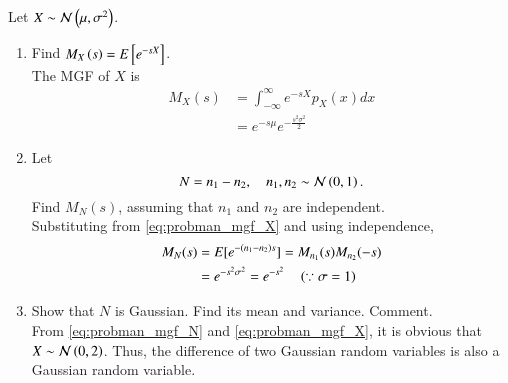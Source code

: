 Let $X \sim \mathcal{N}\left(\mu,\sigma^2\right)$.

\begin{enumerate}[label=\thesection.\arabic*.,ref=\thesection.\theenumi]
\item
Find $M_{X}\left(s\right) = E{}\left[e^{-sX}\right]$.
\\
\solution The MGF of $X$ is
%
\begin{align}
M_{X}(s) &=\int_{-\infty}^{\infty}e^{-s X}p_{X}(x) dx 
\\
&=e^{-s\mu}e^{-\frac{s^2\sigma^2}{2}}
\label{eq:probman_mgf_X}
\end{align}
%
\item
Let 
%
\begin{equation}
N = n_1 - n_2, \quad   n_1,n_2 \sim \mathcal{N}\left(0,1\right).
\end{equation}
%
Find $M_{N}(s)$, assuming that $n_1$ and $n_2$ are independent.
\\
\solution Substituting from \eqref{eq:probman_mgf_X} and using independence,
\begin{align}
M_N(s)&=E[e^{-(n_1-n_2)s}]=M_{n_1}(s) M_{n_2}(-s)
\\
&= e^{-s^2\sigma^2} = e^{-s^2} \quad \left(\because \sigma = 1\right)
\label{eq:probman_mgf_N}
\end{align}
%
\item
Show that $N$ is Gaussian. Find its mean and variance.  Comment.
\\
\solution From \eqref{eq:probman_mgf_N} and \eqref{eq:probman_mgf_X}, it is obvious that $X \sim \mathcal{N}\left(0,2\right)$.  Thus,
%
the difference of two Gaussian random variables is also a Gaussian random variable.

\end{enumerate}

